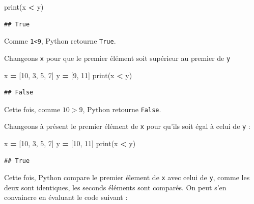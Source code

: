 \documentclass[
  12pt,
]{book}
\newenvironment{Shaded}{\begin{snugshade}}{\end{snugshade}}
\newcommand{\BuiltInTok}[1]{#1}
\newcommand{\DecValTok}[1]{\textcolor[rgb]{0.00,0.00,0.81}{#1}}
\newcommand{\NormalTok}[1]{#1}
\newcommand{\OperatorTok}[1]{\textcolor[rgb]{0.81,0.36,0.00}{\textbf{#1}}}
\numberwithin{equation}{section}
\numberwithin{countremarque}{section}
\begin{document}
\begin{Shaded}
\begin{Highlighting}[]
\BuiltInTok{print}\NormalTok{(x }\OperatorTok{\textless{}}\NormalTok{ y)}
\end{Highlighting}
\end{Shaded}

\begin{lstlisting}
## True
\end{lstlisting}

Comme \texttt{1\textless{}9}, Python retourne \texttt{True}.

Changeons \texttt{x} pour que le premier élément soit supérieur au premier de \texttt{y}

\begin{Shaded}
\begin{Highlighting}[]
\NormalTok{x }\OperatorTok{=}\NormalTok{ [}\DecValTok{10}\NormalTok{, }\DecValTok{3}\NormalTok{, }\DecValTok{5}\NormalTok{, }\DecValTok{7}\NormalTok{]}
\NormalTok{y }\OperatorTok{=}\NormalTok{ [}\DecValTok{9}\NormalTok{, }\DecValTok{11}\NormalTok{]}
\BuiltInTok{print}\NormalTok{(x }\OperatorTok{\textless{}}\NormalTok{ y)}
\end{Highlighting}
\end{Shaded}

\begin{lstlisting}
## False
\end{lstlisting}

Cette fois, comme \(10>9\), Python retourne \texttt{False}.

Changeons à présent le premier élément de \texttt{x} pour qu'ils soit égal à celui de \texttt{y} :

\begin{Shaded}
\begin{Highlighting}[]
\NormalTok{x }\OperatorTok{=}\NormalTok{ [}\DecValTok{10}\NormalTok{, }\DecValTok{3}\NormalTok{, }\DecValTok{5}\NormalTok{, }\DecValTok{7}\NormalTok{]}
\NormalTok{y }\OperatorTok{=}\NormalTok{ [}\DecValTok{10}\NormalTok{, }\DecValTok{11}\NormalTok{]}
\BuiltInTok{print}\NormalTok{(x }\OperatorTok{\textless{}}\NormalTok{ y)}
\end{Highlighting}
\end{Shaded}

\begin{lstlisting}
## True
\end{lstlisting}

Cette fois, Python compare le premier élement de \texttt{x} avec celui de \texttt{y}, comme les deux sont identiques, les seconds éléments sont comparés. On peut s'en convaincre en évaluant le code suivant :
\end{document}
